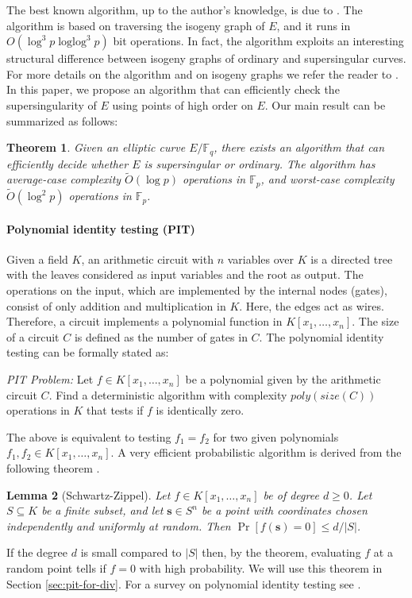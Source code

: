 \documentclass[review]{elsarticle}
\theoremstyle{plain}
\newtheorem{theorem}{Theorem}
\newtheorem{lemma}[theorem]{Lemma}
\theoremstyle{definition}
\newcommand{\abs}[1]{\left\vert#1\right\vert}
\newcommand{\tildO}{\tilde{O}}
\DeclareMathOperator{\loglog}{loglog}
\def\F{\ensuremath{\mathbb{F}}}
\begin{document}
The best known algorithm, up to the author's knowledge, is due to \cite{sutherland2012}. The 
algorithm is based on traversing the isogeny graph of $E$, and it runs in $O(\log^3p \loglog^3p)$ 
bit operations. In fact, the algorithm exploits an interesting structural difference between 
isogeny graphs of ordinary and supersingular curves. For more details on the algorithm and on 
isogeny graphs we refer the reader to \cite{sutherland2012, kohel1996}. In this paper, we propose 
an algorithm that can efficiently check the supersingularity of $E$ using points of high order on 
$E$. Our main result can be summarized as follows:
\begin{theorem}
	\label{theo:main}
	Given an elliptic curve $E/\F_q$, there exists an algorithm that can efficiently decide whether 
	$E$ is supersingular or ordinary. The algorithm has average-case complexity $\tildO(\log p)$ 
	operations in $\F_p$, and worst-case complexity $\tildO(\log^2 p)$ operations in $\F_p$.
\end{theorem}

\paragraph{Polynomial identity testing (PIT)}
Given a field $K$, an arithmetic circuit with $n$ variables over $K$ is a directed tree with the 
leaves considered as input variables and the root as output. The operations on the input, which are 
implemented by the internal nodes (gates), consist of only addition and multiplication in $K$. 
Here, the edges act as wires. Therefore, a circuit implements a polynomial function in $K[x_1, 
\dots, x_n]$. The size of a circuit $C$ is defined as the number of gates in $C$. The polynomial 
identity testing can be formally stated as: 

\vspace*{2mm}

\textit{PIT Problem:} Let $f \in K[x_1, \dots, x_n]$ be a polynomial given by the arithmetic 
circuit $C$. Find a deterministic algorithm with complexity $poly(size(C))$ operations in $K$ that 
tests if $f$ is identically zero.

\vspace*{2mm}

The above is equivalent to testing $f_1 = f_2$ for two given polynomials $f_1, f_2 \in K[x_1, 
\dots, x_n]$. A very efficient probabilistic algorithm is derived from the following theorem 
\cite{schwartz1980,zippel1979}.
\begin{lemma}[Schwartz-Zippel]
	\label{lemma:Schwartz-Zippel}
	Let $f \in K[x_1, \dots, x_n]$ be of degree $d \ge 0$. Let $S \subseteq K$ be a finite subset, 
	and let $\mathbf{s} \in S^n$ be a point with coordinates chosen independently and uniformly at 
	random. Then $\Pr[f(\mathbf{s}) = 0] \le d / \abs{S}$.
\end{lemma}
If the degree $d$ is small compared to $\abs{S}$ then, by the theorem, evaluating $f$ at a random 
point tells if $f = 0$ with high probability. We will use this theorem in Section 
\ref{sec:pit-for-div}. For a survey on polynomial identity testing see \cite{saxena2009}.
\end{document}
